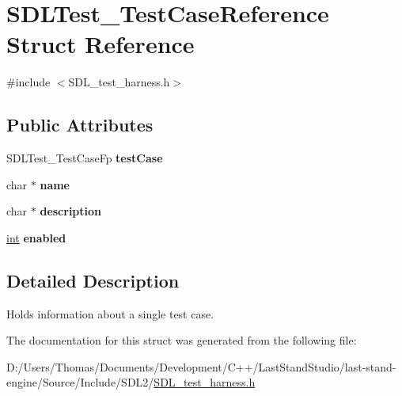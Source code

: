 \hypertarget{structSDLTest__TestCaseReference}{}\section{S\+D\+L\+Test\+\_\+\+Test\+Case\+Reference Struct Reference}
\label{structSDLTest__TestCaseReference}


{\ttfamily \#include $<$S\+D\+L\+\_\+test\+\_\+harness.\+h$>$}

\subsection*{Public Attributes}
\begin{DoxyCompactItemize}
\item 
\hypertarget{structSDLTest__TestCaseReference_af9472f0c421a2845b540fc28fb30a3ef}{}S\+D\+L\+Test\+\_\+\+Test\+Case\+Fp {\bfseries test\+Case}\label{structSDLTest__TestCaseReference_af9472f0c421a2845b540fc28fb30a3ef}

\item 
\hypertarget{structSDLTest__TestCaseReference_aabd588c915c52fb13bcd0c71e071a604}{}char $\ast$ {\bfseries name}\label{structSDLTest__TestCaseReference_aabd588c915c52fb13bcd0c71e071a604}

\item 
\hypertarget{structSDLTest__TestCaseReference_a1ee6c8a2529fdfcd62bb1483c26be67d}{}char $\ast$ {\bfseries description}\label{structSDLTest__TestCaseReference_a1ee6c8a2529fdfcd62bb1483c26be67d}

\item 
\hypertarget{structSDLTest__TestCaseReference_a15168c85e38cae7557b4beb477ef6f9a}{}\hyperlink{SDL__thread_8h_a6a64f9be4433e4de6e2f2f548cf3c08e}{int} {\bfseries enabled}\label{structSDLTest__TestCaseReference_a15168c85e38cae7557b4beb477ef6f9a}

\end{DoxyCompactItemize}


\subsection{Detailed Description}
Holds information about a single test case. 

The documentation for this struct was generated from the following file\+:\begin{DoxyCompactItemize}
\item 
D\+:/\+Users/\+Thomas/\+Documents/\+Development/\+C++/\+Last\+Stand\+Studio/last-\/stand-\/engine/\+Source/\+Include/\+S\+D\+L2/\hyperlink{SDL__test__harness_8h}{S\+D\+L\+\_\+test\+\_\+harness.\+h}\end{DoxyCompactItemize}
